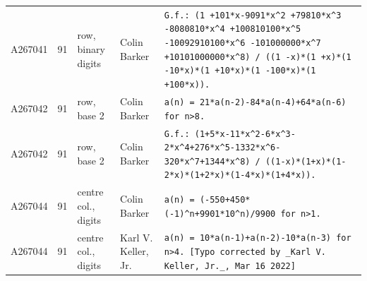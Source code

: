 \documentclass[11pt]{article}
\theoremstyle{definition}
\theoremstyle{remark}
\begin{document}
{\begin{longtable}{p{1.3cm}p{0.7cm}p{2.4cm}p{2.3cm}p{7.3cm}}
A267041 & 91 & row, binary digits & Colin Barker & \texttt{G.f.: \allowbreak{}(1 \allowbreak{}+\allowbreak{}101*\allowbreak{}x-\allowbreak{}9091*\allowbreak{}x\^{}2 \allowbreak{}+\allowbreak{}79810*\allowbreak{}x\^{}3 \allowbreak{}-\allowbreak{}8080810*\allowbreak{}x\^{}4 \allowbreak{}+\allowbreak{}100810100*\allowbreak{}x\^{}5 \allowbreak{}-\allowbreak{}10092910100*\allowbreak{}x\^{}6 \allowbreak{}-\allowbreak{}101000000*\allowbreak{}x\^{}7 \allowbreak{}+\allowbreak{}10101000000*\allowbreak{}x\^{}8)\allowbreak{} \allowbreak{}/\allowbreak{} \allowbreak{}((1 \allowbreak{}-\allowbreak{}x)\allowbreak{}*\allowbreak{}(1 \allowbreak{}+\allowbreak{}x)\allowbreak{}*\allowbreak{}(1 \allowbreak{}-\allowbreak{}10*\allowbreak{}x)\allowbreak{}*\allowbreak{}(1 \allowbreak{}+\allowbreak{}10*\allowbreak{}x)\allowbreak{}*\allowbreak{}(1 \allowbreak{}-\allowbreak{}100*\allowbreak{}x)\allowbreak{}*\allowbreak{}(1 \allowbreak{}+\allowbreak{}100*\allowbreak{}x)\allowbreak{})\allowbreak{}.} \\
A267042 & 91 & row, base 2 & Colin Barker & \texttt{a(n)\allowbreak{} \allowbreak{}=\allowbreak{} \allowbreak{}21*\allowbreak{}a(n-\allowbreak{}2)\allowbreak{}-\allowbreak{}84*\allowbreak{}a(n-\allowbreak{}4)\allowbreak{}+\allowbreak{}64*\allowbreak{}a(n-\allowbreak{}6)\allowbreak{} \allowbreak{}for \allowbreak{}n>8.} \\
A267042 & 91 & row, base 2 & Colin Barker & \texttt{G.f.: \allowbreak{}(1+\allowbreak{}5*\allowbreak{}x-\allowbreak{}11*\allowbreak{}x\^{}2-\allowbreak{}6*\allowbreak{}x\^{}3-\allowbreak{}2*\allowbreak{}x\^{}4+\allowbreak{}276*\allowbreak{}x\^{}5-\allowbreak{}1332*\allowbreak{}x\^{}6-\allowbreak{}320*\allowbreak{}x\^{}7+\allowbreak{}1344*\allowbreak{}x\^{}8)\allowbreak{} \allowbreak{}/\allowbreak{} \allowbreak{}((1-\allowbreak{}x)\allowbreak{}*\allowbreak{}(1+\allowbreak{}x)\allowbreak{}*\allowbreak{}(1-\allowbreak{}2*\allowbreak{}x)\allowbreak{}*\allowbreak{}(1+\allowbreak{}2*\allowbreak{}x)\allowbreak{}*\allowbreak{}(1-\allowbreak{}4*\allowbreak{}x)\allowbreak{}*\allowbreak{}(1+\allowbreak{}4*\allowbreak{}x)\allowbreak{})\allowbreak{}.} \\
A267044 & 91 & centre col., digits & Colin Barker & \texttt{a(n)\allowbreak{} \allowbreak{}=\allowbreak{} \allowbreak{}(-\allowbreak{}550+\allowbreak{}450*\allowbreak{}(-\allowbreak{}1)\allowbreak{}\^{}n+\allowbreak{}9901*\allowbreak{}10\^{}n)\allowbreak{}/\allowbreak{}9900 \allowbreak{}for \allowbreak{}n>1.} \\
A267044 & 91 & centre col., digits & Karl V. Keller, Jr. & \texttt{a(n)\allowbreak{} \allowbreak{}=\allowbreak{} \allowbreak{}10*\allowbreak{}a(n-\allowbreak{}1)\allowbreak{}+\allowbreak{}a(n-\allowbreak{}2)\allowbreak{}-\allowbreak{}10*\allowbreak{}a(n-\allowbreak{}3)\allowbreak{} \allowbreak{}for \allowbreak{}n>4. \allowbreak{}[Typo \allowbreak{}corrected \allowbreak{}by \allowbreak{}\_Karl \allowbreak{}V. \allowbreak{}Keller,\allowbreak{} \allowbreak{}Jr.\_,\allowbreak{} \allowbreak{}Mar \allowbreak{}16 \allowbreak{}2022]} \\

\end{longtable}}
\end{document}

